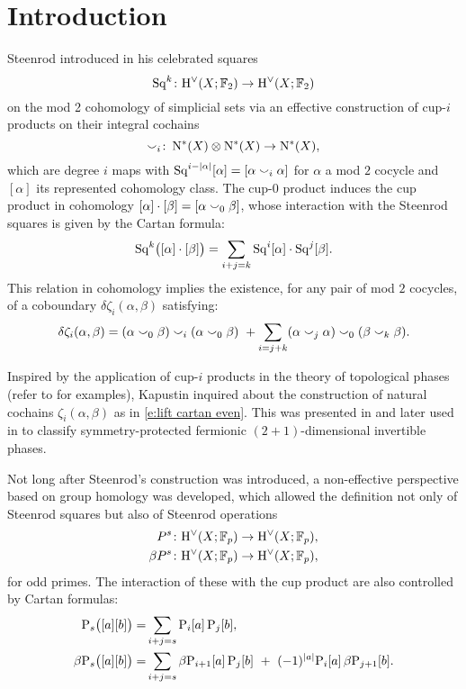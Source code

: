
\section{Introduction} \label{s:introduction}

Steenrod introduced in \cite{steenrod1947products} his celebrated squares
\[
\operatorname{Sq}^k \colon \mathrm{H}^\vee(X; {\mathbb{F}_2}) \to \mathrm{H}^\vee(X; {\mathbb{F}_2})
\]
on the mod 2 cohomology of simplicial sets via an effective construction of cup-$i$ products on their integral cochains
\[
\smallsmile_i \colon \operatorname{N^{\ast}}(X) \otimes \operatorname{N^{\ast}}(X) \to \operatorname{N^{\ast}}(X),
\]
which are degree $i$ maps with $\operatorname{Sq}^{i-\lvert\alpha\rvert}[\alpha] = [\alpha \smallsmile_i \alpha]$ for $\alpha$ a mod $2$ cocycle and $[\alpha]$ its represented cohomology class.
The cup-$0$ product induces the cup product in cohomology $[\alpha] \cdot [\beta] = [\alpha \smallsmile_0 \beta]$, whose interaction with the Steenrod squares is given by the Cartan formula:
\[
\operatorname{Sq}^k\!\big([\alpha] \cdot [\beta]\big) = \sum_{i+j=k} \operatorname{Sq}^i [\alpha] \cdot \operatorname{Sq}^j[\beta].
\]
This relation in cohomology implies the existence, for any pair of mod $2$ cocycles, of a coboundary $\delta\zeta_i(\alpha,\beta)$ satisfying:
\begin{equation}\label{e:lift cartan even}
	\delta\zeta_i(\alpha, \beta) =
	(\alpha \smallsmile_0 \beta) \smallsmile_i (\alpha \smallsmile_0 \beta) \ +
	\sum_{i=j+k} (\alpha \smallsmile_j \alpha) \smallsmile_0 (\beta \smallsmile_k \beta).
\end{equation}

Inspired by the application of cup-$i$ products in the theory of topological phases (refer to \cite{kapustin2015cobordism, gaiotto2016spin, kapustin2017fermionic} for examples), Kapustin inquired about the construction of natural cochains $\zeta_i(\alpha, \beta)$ as in \eqref{e:lift cartan even}.
This was presented in \cite{medina2020cartan} and later used in \cite{barkeshli2021classification} to classify symmetry-protected fermionic $(2+1)$-dimensional invertible phases.

Not long after Steenrod's construction was introduced, a non-effective perspective based on group homology was developed, which allowed the definition not only of Steenrod squares but also of Steenrod operations
\begin{align*}
	P^s \colon& \mathrm{H}^\vee(X; {\mathbb{F}_p}) \to \mathrm{H}^\vee(X; {\mathbb{F}_p}), \\
	\beta P^s \colon& \mathrm{H}^\vee(X; {\mathbb{F}_p}) \to \mathrm{H}^\vee(X; {\mathbb{F}_p}),
\end{align*}
for odd primes.
The interaction of these with the cup product are also controlled by Cartan formulas:
\begin{align*}
	\mathrm{P}_s\big([a][b]\big) =&
	\sum_{i+j=s} \mathrm{P}_i[a] \, \mathrm{P}_j[b], \\
	\beta\mathrm{P}_s\big([a][b]\big) =&
	\sum_{i+j=s} \beta\mathrm{P}_{i+1}[a] \, \mathrm{P}_j[b] \ +\ (-1)^{\lvert a\rvert} \mathrm{P}_i[a] \, \beta\mathrm{P}_{j+1}[b].
\end{align*}

